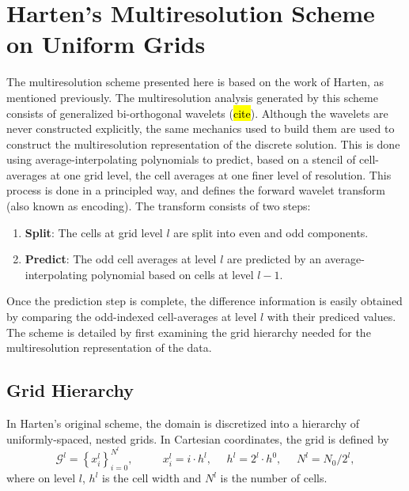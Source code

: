\documentclass{article}
\begin{document}
\section{Harten's Multiresolution Scheme on Uniform Grids}

    The multiresolution scheme presented here is based on the work of Harten, as
    mentioned previously. The multiresolution analysis generated by this scheme
    consists of generalized bi-orthogonal wavelets (\hl{cite}). Although the
    wavelets are never constructed explicitly, the same mechanics used to build
    them are used to construct the multiresolution representation of the
    discrete solution.  This is done using average-interpolating polynomials to
    predict, based on a stencil of cell-averages at one grid level, the cell
    averages at one finer level of resolution. This process is done in a
    principled way, and defines the forward wavelet transform (also known as
    encoding). The transform consists of two steps:
    \begin{enumerate}
        \item[] \textbf{Split}: The cells at grid level $l$ are split into even and odd
                components.
        \item[] \textbf{Predict}: The odd cell averages at level $l$ are predicted
                by an average-interpolating polynomial based on cells at
                level $l-1$.
    \end{enumerate}
    Once the prediction step is complete, the difference information is
    easily obtained by comparing the odd-indexed cell-averages at level $l$ with
    their prediced values. The scheme is detailed by first examining the grid
    hierarchy needed for the multiresolution representation of the data.

    \subsection*{Grid Hierarchy}

        In Harten's original scheme, the domain is discretized into a
        hierarchy of uniformly-spaced, nested grids. In Cartesian
        coordinates, the grid is defined by
        \begin{equation}
            \mathcal{G}^{l} = \left\{ x_{i}^{l} \right\}_{i=0}^{N^{l}}, \text{ }
            \text{ } \text{ } \text{ } x_{i}^{l} = i \cdot h^{l}, \text{ }
            \text{ } h^{l} = 2^{l} \cdot h^{0}, \text{ } \text{ } N^{l} = N_{0}
            / 2^{l},
        \end{equation}
        where on level $l$, $h^{l}$ is the cell width and $N^{l}$ is the number of cells.
\end{document}
